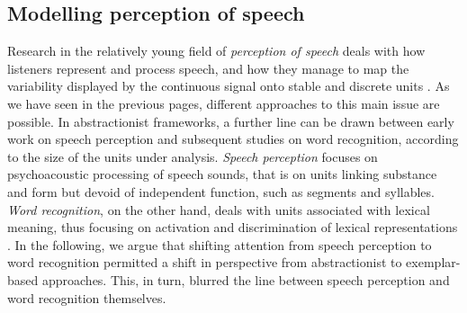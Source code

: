\subsection{Modelling perception of speech}\label{sec111}
Research in the relatively young field of \textit{perception of speech} deals with how listeners represent and process speech, and how they manage to map the variability displayed by the continuous signal onto stable and discrete units \citep{jusczyk2002speech}. As we have seen in the previous pages, different approaches to this main issue are possible. In abstractionist frameworks, a further line can be drawn between early work on speech perception and subsequent studies on word recognition, according to the size of the units under analysis. \textit{Speech perception} focuses on psychoacoustic processing of speech sounds, that is on units linking substance and form but devoid of independent function, such as segments and syllables. \textit{Word recognition}, on the other hand, deals with units associated with lexical meaning, thus focusing on activation and discrimination of lexical representations \citep{luce2003abstractness}. In the following, we argue that shifting attention from speech perception to word recognition permitted a shift in perspective from abstractionist to exemplar-based approaches. This, in turn, blurred the line between speech perception and word recognition themselves. 

